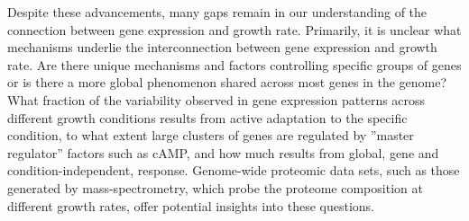 Despite these advancements, many gaps remain in our understanding of the connection between gene expression and growth rate.
Primarily, it is unclear what mechanisms underlie the interconnection between gene expression and growth rate.
Are there unique mechanisms and factors controlling specific groups of genes or is there a more global phenomenon shared across most genes in the genome?
What fraction of the variability observed in gene expression patterns across different growth conditions results from active adaptation to the specific condition, to what extent large clusters of genes are regulated by ''master regulator'' factors such as cAMP, and how much results from global, gene and condition-independent, response.
Genome-wide proteomic data sets, such as those generated by mass-spectrometry, which probe the proteome composition at different growth rates, offer potential insights into these questions.